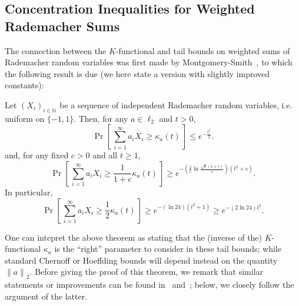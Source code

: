 \documentclass[11pt]{article}
\theoremstyle{remark}   	\newtheorem{remark}[theorem]{Remark}
\theoremstyle{definition}   	\newaliascnt{defn}{theorem}
\newcommand{\proba}{\Pr}
\newcommand{\probaOf}[1]{\proba\!\left[\, #1\, \right]}
\newcommand{\norm}[1]{\lVert#1{\rVert}}
\newcommand{\normtwo}[1]{{\norm{#1}}_2}
\newcommand{\N}{\ensuremath{\mathbb{N}}\xspace}
\newcommand{\lp}[1][1]{\ell_{#1}}
\newcommand{\kf}[1]{\kappa_{#1}}
\begin{document}
\subsection{Concentration Inequalities for Weighted Rademacher  Sums}
 The connection between the $K$-functional and tail bounds on weighted sums of Rademacher random variables was first made by Montgomery-Smith~\cite{MS:90}, to which the following result is due (we here state a version with slightly improved constants):
\begin{theorem}\label{theo:bounds:rademacher:kf}
Let $(X_i)_{i\in\N}$ be a sequence of independent Rademacher random variables, i.e. uniform on $\{-1,1\}$. Then, for any $a\in\lp[2]$ and $t > 0$,
\begin{equation}\label{eq:bounds:rademacher:kf:ub}
  \probaOf{ \sum_{i=1}^\infty a_i X_i \geq \kf{a}(t) } \leq e^{-\frac{t^2}{2} }.
\end{equation}
and, for any fixed $c>0$ and all $t\geq 1$,
\begin{equation}\label{eq:bounds:rademacher:kf:lb}
    \probaOf{ \sum_{i=1}^\infty a_i X_i \geq \frac{1}{1+c}\kf{a}(t) } \geq e^{-\left( \frac{2}{c}\ln\frac{\sqrt{6}(1+c)}{c}\right) (t^2+c) }.
\end{equation}
In particular,
\[
    \probaOf{ \sum_{i=1}^\infty a_i X_i \geq \frac{1}{2}\kf{a}(t) } \geq e^{-\left( \ln 24 \right) (t^2+1) } \geq e^{-\left( 2\ln 24 \right)t^2 }.
\]
\end{theorem}
One can intepret the above theorem as stating that the (inverse of the) $K$-functional $\kf{a}$ is the ``right'' parameter to consider in these tail bounds; while standard Chernoff or Hoeffding bounds will depend instead on the quantity $\normtwo{a}$. Before giving the proof of this theorem, we remark that similar statements or improvements can be found in~\cite{HK:94} and~\cite{Astashkin:2010}; below, we closely follow the argument of the latter.
\end{document}
